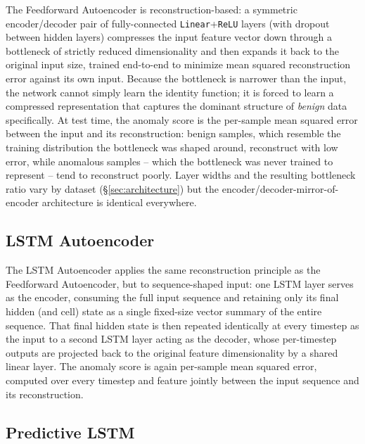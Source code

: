 The Feedforward Autoencoder is reconstruction-based: a symmetric encoder/decoder pair of fully-connected \texttt{Linear}+\texttt{ReLU} layers (with dropout between hidden layers) compresses the input feature vector down through a bottleneck of strictly reduced dimensionality and then expands it back to the original input size, trained end-to-end to minimize mean squared reconstruction error against its own input. Because the bottleneck is narrower than the input, the network cannot simply learn the identity function; it is forced to learn a compressed representation that captures the dominant structure of \emph{benign} data specifically. At test time, the anomaly score is the per-sample mean squared error between the input and its reconstruction: benign samples, which resemble the training distribution the bottleneck was shaped around, reconstruct with low error, while anomalous samples -- which the bottleneck was never trained to represent -- tend to reconstruct poorly. Layer widths and the resulting bottleneck ratio vary by dataset (\S\ref{sec:architecture}) but the encoder/decoder-mirror-of-encoder architecture is identical everywhere.

\subsection{LSTM Autoencoder}

The LSTM Autoencoder applies the same reconstruction principle as the Feedforward Autoencoder, but to sequence-shaped input: one LSTM layer serves as the encoder, consuming the full input sequence and retaining only its final hidden (and cell) state as a single fixed-size vector summary of the entire sequence. That final hidden state is then repeated identically at every timestep as the input to a second LSTM layer acting as the decoder, whose per-timestep outputs are projected back to the original feature dimensionality by a shared linear layer. The anomaly score is again per-sample mean squared error, computed over every timestep and feature jointly between the input sequence and its reconstruction.

\subsection{Predictive LSTM}

